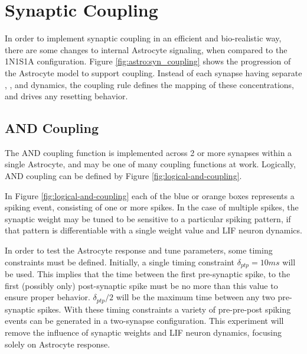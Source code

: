 \section{Synaptic Coupling}
In order to implement synaptic coupling in an efficient and bio-realistic way,
there are some changes to internal Astrocyte signaling, when compared to the
1N1S1A configuration. Figure \ref{fig:astro:syn_coupling} shows the progression
of the Astrocyte model to support coupling. Instead of each synapse having
separate \ipt, \kp, and \ca dynamics, the coupling rule defines the mapping of
these concentrations, and drives any resetting behavior.


\subsection{AND Coupling}

The AND coupling function is implemented across 2 or more synapses within a
single Astrocyte, and may be one of many coupling functions at work. Logically,
AND coupling can be defined by Figure \ref{fig:logical-and-coupling}.


In Figure \ref{fig:logical-and-coupling} each of the blue or orange boxes
represents a spiking event, consisting of one or more spikes. In the case of
multiple spikes, the synaptic weight may be tuned to be sensitive to a
particular spiking pattern, if that pattern is differentiable with a single
weight value and LIF neuron dynamics.

In order to test the Astrocyte response and tune parameters, some timing
constraints must be defined. Initially, a single timing constraint
$\delta_{ptp}=10ms$ will be used. This implies that the time between the
first pre-synaptic spike, to the first (possibly only) post-synaptic spike must
be no more than this value to ensure proper behavior. $\delta_{ptp}/2$ will be
the maximum time between any two pre-synaptic spikes. With these timing
constraints a variety of pre-pre-post spiking events can be generated in a
two-synapse configuration. This experiment will remove the influence of synaptic
weights and LIF neuron dynamics, focusing solely on Astrocyte response.
